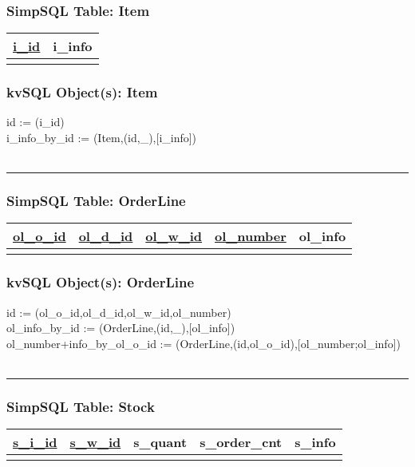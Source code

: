 \documentclass[12pt,letter]{article}
\begin{document}
\subsubsection*{SimpSQL Table: Item}  
\begin{tabular}{ |c|c| }
 \hline
 \underline{i\_id} & i\_info\\
 \hline
 &   \\
 \hline
\end{tabular}

\subsubsection*{kvSQL Object(s): Item}  
id := (i\_id)\\
 i\_info\_by\_id := 
(Item,(id,\_),[i\_info]) \\
\\
\hrule


\subsubsection*{SimpSQL Table: OrderLine}  
\begin{tabular}{ |c|c|c|c|c| }
 \hline
 \underline{ol\_o\_id} & \underline{ol\_d\_id} & \underline{ol\_w\_id} &
 \underline{ol\_number} & ol\_info\\
 \hline
 &   &   & & \\
 \hline
\end{tabular}

\subsubsection*{kvSQL Object(s): OrderLine}  
id := (ol\_o\_id,ol\_d\_id,ol\_w\_id,ol\_number) \\
ol\_info\_by\_id :=
(OrderLine,(id,\_),[ol\_info]) \\
ol\_number+info\_by\_ol\_o\_id :=
(OrderLine,(id,ol\_o\_id),[ol\_number;ol\_info]) \\
\\ 
\hrule


\subsubsection*{SimpSQL Table: Stock}  
\begin{tabular}{ |c|c|c|c|c| }
 \hline
 \underline{s\_i\_id} & \underline{s\_w\_id} & s\_quant & s\_order\_cnt &
 s\_info \\
 \hline
 &   &   & & \\
 \hline
\end{tabular}
\end{document}
